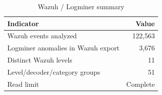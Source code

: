 \begin{table}[t]
\caption{Wazuh / Logminer summary}
\label{tab:wazuh_summary}
\centering
\scriptsize
\begin{tabular}{l r}
\toprule
\textbf{Indicator} & \textbf{Value} \\
\midrule
Wazuh events analyzed & 122,563 \\
Logminer anomalies in Wazuh export & 3,676 \\
Distinct Wazuh levels & 11 \\
Level/decoder/category groups & 51 \\
Read limit & Complete \\
\bottomrule
\end{tabular}
\end{table}
